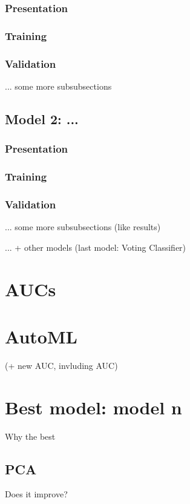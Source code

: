 \subsubsection{Presentation}
\subsubsection{Training}
\subsubsection{Validation}
... some more subsubsections

\subsection{Model 2: ...}
\subsubsection{Presentation}
\subsubsection{Training}
\subsubsection{Validation}
... some more subsubsections (like results)

... + other models (last model: Voting Classifier)

\section{AUCs}

\section{AutoML}
(+ new AUC, invluding AUC)


\section{Best model: model n}
Why the best
\subsection{PCA}
Does it improve?







